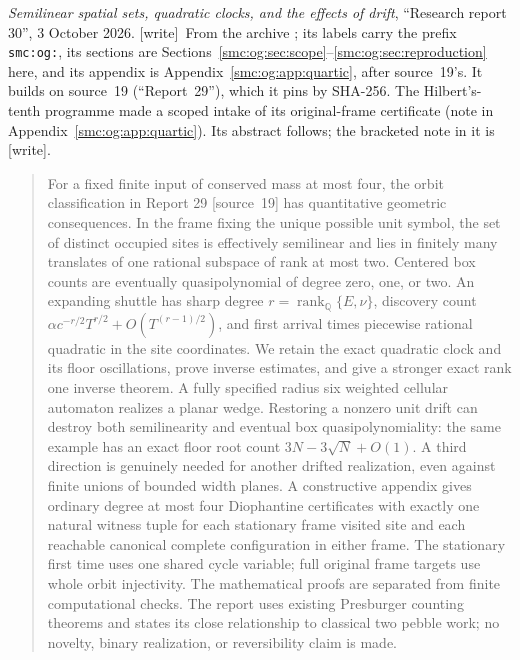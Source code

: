 \documentclass[11pt,letterpaper]{article}
\numberwithin{equation}{section}
\theoremstyle{definition}
\theoremstyle{remark}
\newcommand{\Q}{\mathbb Q}
\newcommand{\rank}{\operatorname{rank}}
\newcommand{\wtag}{\textup{[write]}}
\begin{document}
\bigskip
{}
\par
\noindent\emph{Semilinear spatial sets, quadratic clocks, and the effects of drift}, ``Research report 30'', 3 October 2026. \wtag\ From the archive ; its labels carry the prefix \texttt{smc:og:}, its sections are Sections~\ref{smc:og:sec:scope}--\ref{smc:og:sec:reproduction} here, and its appendix is Appendix~\ref{smc:og:app:quartic}, after source~19's. It builds on source~19 (``Report~29''), which it pins by SHA-256. The Hilbert's-tenth programme made a scoped intake of its original-frame certificate (note in Appendix~\ref{smc:og:app:quartic}). Its abstract follows; the bracketed note in it is \wtag.
\begin{quote}\small
For a fixed finite input of conserved mass at most four, the orbit classification in Report 29 [source~19] has quantitative geometric consequences. In the frame fixing the unique possible unit symbol, the set of distinct occupied sites is effectively semilinear and lies in finitely many translates of one rational subspace of rank at most two. Centered box counts are eventually quasipolynomial of degree zero, one, or two. An expanding shuttle has sharp degree $r=\rank_{\Q}\{E,\nu\}$, discovery count $\alpha c^{-r/2}T^{r/2}+O(T^{(r-1)/2})$, and first arrival times piecewise rational quadratic in the site coordinates. We retain the exact quadratic clock and its floor oscillations, prove inverse estimates, and give a stronger exact rank one inverse theorem. A fully specified radius six weighted cellular automaton realizes a planar wedge. Restoring a nonzero unit drift can destroy both semilinearity and eventual box quasipolynomiality: the same example has an exact floor root count $3N-3\sqrt N+O(1)$. A third direction is genuinely needed for another drifted realization, even against finite unions of bounded width planes. A constructive appendix gives ordinary degree at most four Diophantine certificates with exactly one natural witness tuple for each stationary frame visited site and each reachable canonical complete configuration in either frame. The stationary first time uses one shared cycle variable; full original frame targets use whole orbit injectivity. The mathematical proofs are separated from finite computational checks. The report uses existing Presburger counting theorems and states its close relationship to classical two pebble work; no novelty, binary realization, or reversibility claim is made.
\end{quote}
\end{document}
